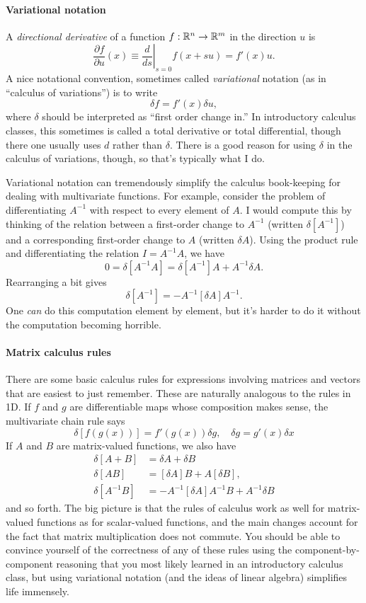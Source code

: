 \documentclass[12pt, leqno]{article}
\begin{document}
\paragraph{Variational notation}
A {\em directional derivative} of a function $f : \mathbb{R}^n \rightarrow
\mathbb{R}^m$ in the direction $u$ is
\[
  \frac{\partial f}{\partial u}(x) \equiv
  \left. \frac{d}{ds} \right|_{s=0} f(x+su) = f'(x) u.
\]
A nice notational convention, sometimes called {\em variational}
notation (as in ``calculus of variations'') is to write
\[
  \delta f = f'(x) \delta u,
\]
where $\delta$ should be interpreted as ``first order change in.''
In introductory calculus classes, this sometimes is called
a total derivative or total differential, though there one usually
uses $d$ rather than $\delta$.  There is a good reason for using
$\delta$ in the calculus of variations, though, so that's typically
what I do.

Variational notation can tremendously simplify the calculus
book-keeping for dealing with multivariate functions.  For example,
consider the problem of differentiating $A^{-1}$ with respect to
every element of $A$.  I would compute this by thinking of the
relation between a first-order change to $A^{-1}$ (written
$\delta [A^{-1}]$) and a corresponding first-order change to $A$
(written $\delta A$).  Using the product rule and differentiating
the relation $I = A^{-1} A$, we have
\[
  0 = \delta [A^{-1} A] = \delta [A^{-1}] A + A^{-1} \delta A.
\]
Rearranging a bit gives
\[
  \delta [A^{-1}] = -A^{-1} [\delta A] A^{-1}.
\]
One {\em can} do this computation element by element, but it's harder
to do it without the computation becoming horrible.

\paragraph{Matrix calculus rules}
There are some basic calculus rules for expressions involving matrices
and vectors that are easiest to just remember.  These are naturally
analogous to the rules in 1D.  If $f$ and $g$ are differentiable maps
whose composition makes sense, the multivariate chain rule says
\[
  \delta [f(g(x))] = f'(g(x)) \delta g, \quad
  \delta g = g'(x) \delta x
\]
If $A$ and $B$ are matrix-valued functions, we also have
\begin{align*}
  \delta [A+B] &= \delta A + \delta B \\
  \delta [AB] &= [\delta A] B + A [\delta B], \\
  \delta [A^{-1} B] &= -A^{-1} [\delta A] A^{-1} B + A^{-1} \delta B
\end{align*}
and so forth.  The big picture is that the rules of calculus work as
well for matrix-valued functions as for scalar-valued functions,
and the main changes account for the fact that matrix multiplication
does not commute.  You should be able to convince yourself of the
correctness of any of these rules using the component-by-component
reasoning that you most likely learned in an introductory calculus
class, but using variational notation (and the ideas of linear
algebra) simplifies life immensely.
\end{document}
